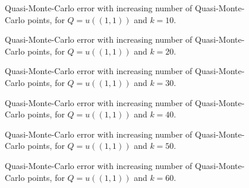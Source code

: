 \begin{figure}[h]
    \centering
    
    \caption[Quasi-Monte-Carlo error, for $Q=u((1,1))$ and $k=10$.]{Quasi-Monte-Carlo error with increasing number of Quasi-Monte-Carlo points, for $Q=u((1,1))$ and $k=10$. \label{fig:qmctop_right10}}
  \end{figure}
\begin{figure}[h]
  \centering

\caption[Quasi-Monte-Carlo error, for $Q=u((1,1))$ and $k=20$.]{Quasi-Monte-Carlo error with increasing number of Quasi-Monte-Carlo points, for $Q=u((1,1))$ and $k=20$. \label{fig:qmctop_right20}}
\end{figure}
\begin{figure}[h]
    \centering
    
    \caption[Quasi-Monte-Carlo error, for $Q=u((1,1))$ and $k=30$.]{Quasi-Monte-Carlo error with increasing number of Quasi-Monte-Carlo points, for $Q=u((1,1))$ and $k=30$. \label{fig:qmctop_right30}}
  \end{figure}
\begin{figure}[h]
  \centering

\caption[Quasi-Monte-Carlo error, for $Q=u((1,1))$ and $k=40$.]{Quasi-Monte-Carlo error with increasing number of Quasi-Monte-Carlo points, for $Q=u((1,1))$ and $k=40$. \label{fig:qmctop_right40}}
\end{figure}
\begin{figure}[h]
    \centering
    
    \caption[Quasi-Monte-Carlo error, for $Q=u((1,1))$ and $k=50$.]{Quasi-Monte-Carlo error with increasing number of Quasi-Monte-Carlo points, for $Q=u((1,1))$ and $k=50$. \label{fig:qmctop_right50}}
  \end{figure}
\begin{figure}[h]
  \centering

\caption[Quasi-Monte-Carlo error, for $Q=u((1,1))$ and $k=60$.]{Quasi-Monte-Carlo error with increasing number of Quasi-Monte-Carlo points, for $Q=u((1,1))$ and $k=60$. \label{fig:qmctop_right60}}
\end{figure}

